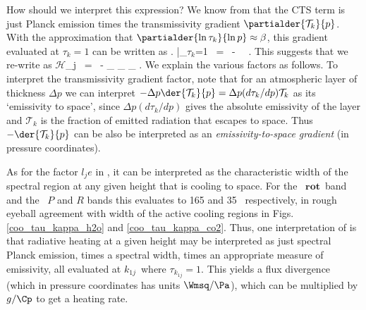 \documentclass[10pt]{article}
\newcommand{\trans}{\ensuremath{\mathcal{T}}}
\newcommand{\ch}{\ensuremath{\mathcal{H}}}
\newcommand{\lj}{\ensuremath{l_j}}
\newcommand{\tauk}{\ensuremath{\tau_k}}
\newcommand{\CTS}{\ensuremath{\mathrm{CTS}}}
\newcommand{\konej}{\ensuremath{k_{1j}}}
\newcommand{\rot}{\ensuremath{\mathbf{rot}}}
\begin{document}
How should we interpret this expression? We know from  that the CTS term is just Planck emission times the transmissivity gradient $\partialder{\trans_k}{p}$. With the approximation that $\partialder{\ln\tauk}{\ln p} \approx \beta$, this gradient evaluated at $\tauk=1$ can be written as 
\beqn
	\left. \partialder{\trans_k}{p} \right |_{\tauk=1}  \ =  \ -\  \ .
\eeqn
This suggests that we re-write  as 
	\beqn
		\ch_j \ = \ - \underbrace{\pi B(\konej,T)}_{ }
					   _{ } 
					   \underbrace{(\lj e)}_{ }    \; .
		\label{heat_cts4}
	\eeqn
We explain the various factors as follows. To interpret the transmissivity gradient factor, note that for an atmospheric layer of thickness $\Delta p$ we can interpret $-\Delta p\der{\trans_k}{p}  = \Delta p (d \tauk/dp)\trans_k$ as its `emissivity to space', since $\Delta p(d \tauk/dp)$ gives the absolute  emissivity of the layer and $\trans_k$ is the fraction of emitted radiation that escapes to space. Thus $-\der{\trans_k}{p}$ can be also be interpreted as an \emph{emissivity-to-space gradient}  (in pressure coordinates). 


As for the factor $\lj e$ in , it can be interpreted as the characteristic  width of the spectral region at any given height that is cooling to space. For the \htwo\ \rot\ band and the  \cotwo\ $P$ and $R$ bands this evaluates to 165 and 35 \cminverse\   respectively, in rough eyeball agreement with width of the active cooling regions in Figs. \ref{coo_tau_kappa_h2o} and \ref{coo_tau_kappa_co2}.  Thus, one interpretation of   is that radiative heating at a given height  may be interpreted as just spectral Planck emission, times a spectral width,  times an appropriate measure of emissivity,  all evaluated at \konej\ where $\tau_{\konej}=1$. This yields a flux divergence (which in pressure coordinates has units $\Wmsq/\Pa$), which can be multiplied by $g/\Cp$ to get a heating rate.
 
\end{document}
